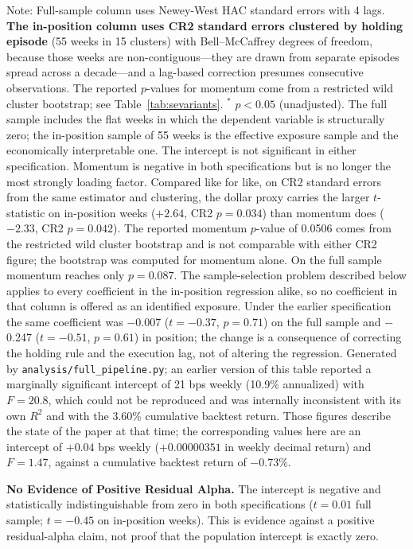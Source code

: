 \documentclass[11pt]{article}
\begin{document}
\begin{table}[H]
\parbox{\linewidth}{\footnotesize Note: Full-sample column uses Newey-West HAC standard errors with 4 lags. \textbf{The in-position column uses CR2 standard errors clustered by holding episode} (55 weeks in 15 clusters) with Bell--McCaffrey degrees of freedom, because those weeks are non-contiguous---they are drawn from separate episodes spread across a decade---and a lag-based correction presumes consecutive observations. The reported $p$-values for momentum come from a restricted wild cluster bootstrap; see Table~\ref{tab:sevariants}. $^{*}$ $p < 0.05$ (unadjusted). The full sample includes the flat weeks in which the dependent variable is structurally zero; the in-position sample of 55 weeks is the effective exposure sample and the economically interpretable one. The intercept is not significant in either specification. Momentum is negative in both specifications but is no longer the most strongly loading factor. Compared like for like, on CR2 standard errors from the same estimator and clustering, the dollar proxy carries the larger $t$-statistic on in-position weeks ($+2.64$, CR2 $p = 0.034$) than momentum does ($-2.33$, CR2 $p = 0.042$). The reported momentum $p$-value of 0.0506 comes from the restricted wild cluster bootstrap and is not comparable with either CR2 figure; the bootstrap was computed for momentum alone. On the full sample momentum reaches only $p = 0.087$. The sample-selection problem described below applies to every coefficient in the in-position regression alike, so no coefficient in that column is offered as an identified exposure. Under the earlier specification the same coefficient was $-$0.007 ($t = -0.37$, $p = 0.71$) on the full sample and $-$0.247 ($t = -0.51$, $p = 0.61$) in position; the change is a consequence of correcting the holding rule and the execution lag, not of altering the regression. Generated by \texttt{analysis/full\_pipeline.py}; an earlier version of this table reported a marginally significant intercept of 21 bps weekly (10.9\% annualized) with $F = 20.8$, which could not be reproduced and was internally inconsistent with its own $R^2$ and with the 3.60\% cumulative backtest return. Those figures describe the state of the paper at that time; the corresponding values here are an intercept of $+0.04$ bps weekly ($+0.00000351$ in weekly decimal return) and $F = 1.47$, against a cumulative backtest return of $-0.73\%$.}
\end{table}

\textbf{No Evidence of Positive Residual Alpha.} The intercept is negative and statistically indistinguishable from zero in both specifications ($t = 0.01$ full sample; $t = -0.45$ on in-position weeks). This is evidence against a positive residual-alpha claim, not proof that the population intercept is exactly zero.
\end{document}
